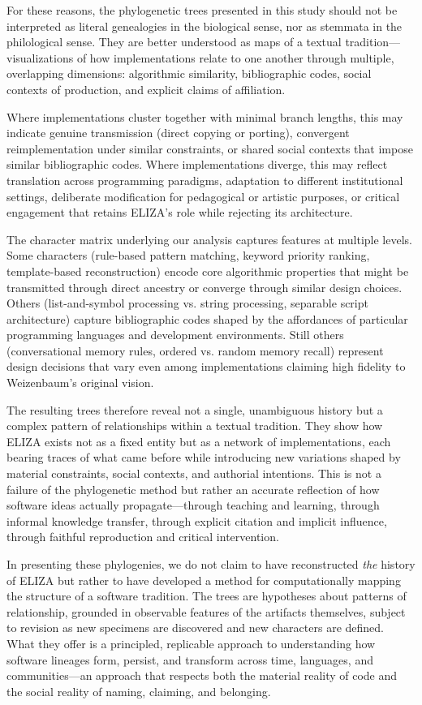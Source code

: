 \documentclass{article}
\begin{document}
For these reasons, the phylogenetic trees presented in this study should not be interpreted as literal genealogies in the biological sense, nor as stemmata in the philological sense. They are better understood as maps of a textual tradition—visualizations of how implementations relate to one another through multiple, overlapping dimensions: algorithmic similarity, bibliographic codes, social contexts of production, and explicit claims of affiliation.

Where implementations cluster together with minimal branch lengths, this may indicate genuine transmission (direct copying or porting), convergent reimplementation under similar constraints, or shared social contexts that impose similar bibliographic codes. Where implementations diverge, this may reflect translation across programming paradigms, adaptation to different institutional settings, deliberate modification for pedagogical or artistic purposes, or critical engagement that retains ELIZA's role while rejecting its architecture.

The character matrix underlying our analysis captures features at multiple levels. Some characters (rule-based pattern matching, keyword priority ranking, template-based reconstruction) encode core algorithmic properties that might be transmitted through direct ancestry or converge through similar design choices. Others (list-and-symbol processing vs. string processing, separable script architecture) capture bibliographic codes shaped by the affordances of particular programming languages and development environments. Still others (conversational memory rules, ordered vs. random memory recall) represent design decisions that vary even among implementations claiming high fidelity to Weizenbaum's original vision.

The resulting trees therefore reveal not a single, unambiguous history but a complex pattern of relationships within a textual tradition. They show how ELIZA exists not as a fixed entity but as a network of implementations, each bearing traces of what came before while introducing new variations shaped by material constraints, social contexts, and authorial intentions. This is not a failure of the phylogenetic method but rather an accurate reflection of how software ideas actually propagate—through teaching and learning, through informal knowledge transfer, through explicit citation and implicit influence, through faithful reproduction and critical intervention.

In presenting these phylogenies, we do not claim to have reconstructed \emph{the} history of ELIZA but rather to have developed a method for computationally mapping the structure of a software tradition. The trees are hypotheses about patterns of relationship, grounded in observable features of the artifacts themselves, subject to revision as new specimens are discovered and new characters are defined. What they offer is a principled, replicable approach to understanding how software lineages form, persist, and transform across time, languages, and communities—an approach that respects both the material reality of code and the social reality of naming, claiming, and belonging.
\end{document}
